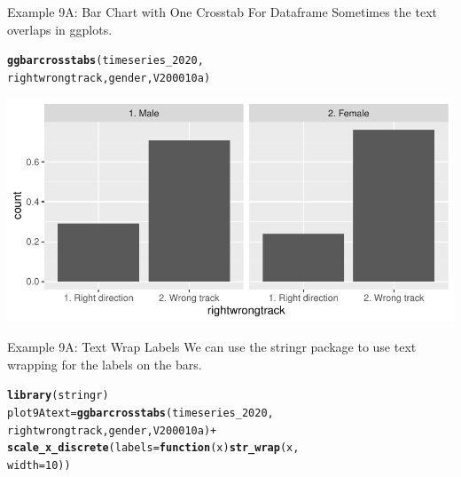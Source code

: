 \documentclass{beamer}\usepackage[]{graphicx}\usepackage[]{xcolor}
\makeatletter
\newcommand{\hlnum}[1]{\textcolor[rgb]{0.686,0.059,0.569}{#1}}%
\newcommand{\hlopt}[1]{\textcolor[rgb]{0,0,0}{#1}}%
\newcommand{\hlstd}[1]{\textcolor[rgb]{0.345,0.345,0.345}{#1}}%
\newcommand{\hlkwa}[1]{\textcolor[rgb]{0.161,0.373,0.58}{\textbf{#1}}}%
\newcommand{\hlkwb}[1]{\textcolor[rgb]{0.69,0.353,0.396}{#1}}%
\newcommand{\hlkwc}[1]{\textcolor[rgb]{0.333,0.667,0.333}{#1}}%
\newcommand{\hlkwd}[1]{\textcolor[rgb]{0.737,0.353,0.396}{\textbf{#1}}}%
\newenvironment{kframe}{%
 \def\at@end@of@kframe{}%
 \ifinner\ifhmode%
  \def\at@end@of@kframe{\end{minipage}}%
  \begin{minipage}{\columnwidth}%
 \fi\fi%
 \def\FrameCommand##1{\hskip\@totalleftmargin \hskip-\fboxsep
 \colorbox{shadecolor}{##1}\hskip-\fboxsep
     \hskip-\linewidth \hskip-\@totalleftmargin \hskip\columnwidth}%
 \MakeFramed {\advance\hsize-\width
   \@totalleftmargin\z@ \linewidth\hsize
   \@setminipage}}%
 {\par\unskip\endMakeFramed%
 \at@end@of@kframe}
\newenvironment{knitrout}{}{} %
\makeatother
\begin{document}
\begin{frame}[fragile]{Example 9A: Bar Chart with One Crosstab For Dataframe}
Sometimes the text overlaps in ggplots.
\begin{knitrout}
\color{fgcolor}\begin{kframe}
\begin{alltt}
\hlkwd{ggbarcrosstabs}\hlstd{(timeseries_2020,}
    \hlstd{rightwrongtrack, gender, V200010a)}
\end{alltt}
\end{kframe}
\includegraphics[width=0.95\linewidth]{figure/unnamed-chunk-52-1} 
\end{knitrout}
\end{frame}

\begin{frame}[fragile]{Example 9A: Text Wrap Labels}
We can use the stringr package to use text wrapping for the labels on the bars.
\begin{knitrout}
\color{fgcolor}\begin{kframe}
\begin{alltt}
\hlkwd{library}\hlstd{(stringr)}
\hlstd{plot9Atext} \hlkwb{=} \hlkwd{ggbarcrosstabs}\hlstd{(timeseries_2020,}
    \hlstd{rightwrongtrack, gender, V200010a)} \hlopt{+}
    \hlkwd{scale_x_discrete}\hlstd{(}\hlkwc{labels} \hlstd{=} \hlkwa{function}\hlstd{(}\hlkwc{x}\hlstd{)} \hlkwd{str_wrap}\hlstd{(x,}
        \hlkwc{width} \hlstd{=} \hlnum{10}\hlstd{))}
\end{alltt}
\end{kframe}
\end{knitrout}
\end{frame}
\end{document}
